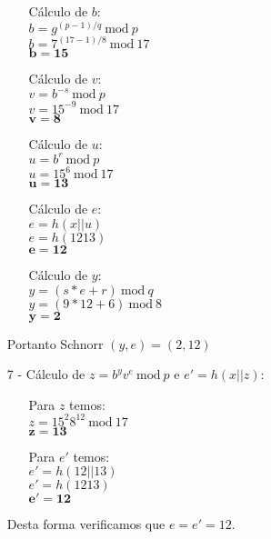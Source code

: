 \documentclass[12pt]{article}
\newcommand{\modd}{\ \text{mod}\ }
\begin{document}
\begin{itemize}
\begin{itemize}
					\item[]
						Cálculo de $b$:\\
						$b = g^{(p-1)/q} \modd p$\\
						$b = 7^{(17-1)/8} \modd 17$\\
						$\mathbf{b = 15}$
					\item[]
						Cálculo de $v$:\\
						$v = b^{-s} \modd p$\\
						$v = 15^{-9} \modd 17$\\
						$\mathbf{v = 8}$
					\item[]
						Cálculo de $u$:\\
						$u = b^r \modd p$\\
						$u = 15^6 \modd 17$\\
						$\mathbf{u = 13}$
					\item[]
						Cálculo de $e$:\\
						$e = h(x||u)$\\
						$e = h(1213)$\\
						$\mathbf{e = 12}$	
					\item[]
						Cálculo de $y$:\\
						$y = (s*e + r) \modd q$\\
						$y = (9*12 + 6) \modd 8$\\
						$\mathbf{y = 2}$						
				\end{itemize}	
			Portanto Schnorr $(y, e) = (2, 12)$	 
			\item[7 -]
				Cálculo de $z = b^y v^e  \modd p$ e $e' = h(x||z)$:\\
				\begin{itemize}
					\item[]
						Para $z$ temos:\\
						$z = 15^2 8^{12}  \modd 17$\\
						$\mathbf{z = 13}$
					\item[]
						Para $e'$ temos:\\
						$e' = h(12||13)$\\
						$e' = h(1213)$\\
						$\mathbf{e' = 12}$	
				\end{itemize}		
				Desta forma verificamos que $e = e' = 12$.									
		\end{itemize}
\end{document}
